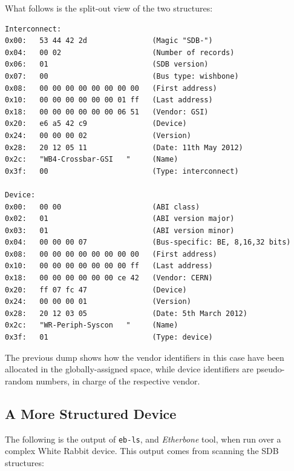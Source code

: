 \documentclass[a4paper, 12pt]{article}
\begin{document}
What follows is the split-out view of the two structures:

\footnotesize
\begin{verbatim}
Interconnect:
0x00:   53 44 42 2d               (Magic "SDB-")
0x04:   00 02                     (Number of records)
0x06:   01                        (SDB version)
0x07:   00                        (Bus type: wishbone)
0x08:   00 00 00 00 00 00 00 00   (First address)
0x10:   00 00 00 00 00 00 01 ff   (Last address)
0x18:   00 00 00 00 00 00 06 51   (Vendor: GSI)
0x20:   e6 a5 42 c9               (Device)
0x24:   00 00 00 02               (Version)
0x28:   20 12 05 11               (Date: 11th May 2012)
0x2c:   "WB4-Crossbar-GSI   "     (Name)
0x3f:   00                        (Type: interconnect)

Device:
0x00:   00 00                     (ABI class)
0x02:   01                        (ABI version major)
0x03:   01                        (ABI version minor)
0x04:   00 00 00 07               (Bus-specific: BE, 8,16,32 bits)
0x08:   00 00 00 00 00 00 00 00   (First address)
0x10:   00 00 00 00 00 00 00 ff   (Last address)
0x18:   00 00 00 00 00 00 ce 42   (Vendor: CERN)
0x20:   ff 07 fc 47               (Device)
0x24:   00 00 00 01               (Version)
0x28:   20 12 03 05               (Date: 5th March 2012)
0x2c:   "WR-Periph-Syscon   "     (Name)
0x3f:   01                        (Type: device)
\end{verbatim}
\normalsize

The previous dump shows how the vendor identifiers in this case have
been allocated in the globally-assigned space, while device identifiers
are pseudo-random numbers, in charge of the respective vendor.

\subsection{A More Structured Device}

The following is the output of \texttt{eb-ls}, and \textit{Etherbone}
tool, when run over a complex White Rabbit device. This output
comes from scanning the SDB structures:
\end{document}
